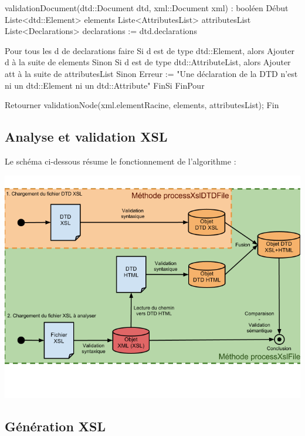 \documentclass[10pt,a4paper]{article}
\begin{document}
\begin{verbatimtab}
validationDocument(dtd::Document dtd, xml::Document xml) : booléen
Début
	Liste<dtd::Element> elements
	Liste<AttributesList> attributesList   
	Liste<Declarations> declarations := dtd.declarations
	
	Pour tous les d de declarations faire
		Si d est de type dtd::Element, alors
			Ajouter d à la suite de elements
		Sinon
       		Si d est de type dtd::AttributeList, alors
       			Ajouter att à la suite de attributesList
			Sinon
       			Erreur := "Une déclaration de la DTD n'est ni un dtd::Element 
       				ni un dtd::Attribute"
		FinSi
	FinPour
   
	Retourner validationNode(xml.elementRacine, elements, attributesList);
Fin
\end{verbatimtab}

\subsection{Analyse et validation XSL}
Le schéma ci-dessous résume le fonctionnement de l'algorithme :

\includegraphics[scale=0.65]{Algorithmes.png}
\subsection{Génération XSL}
\end{document}
